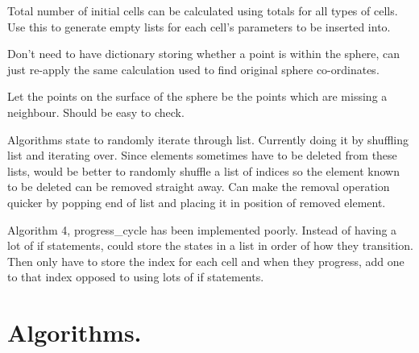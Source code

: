 \documentclass[english]{article}
\begin{document}
Total number of initial cells can be calculated using totals for all types of cells. Use this to generate empty lists for each cell's parameters to be inserted into. 

Don't need to have dictionary storing whether a point is within the sphere, can just re-apply the same calculation used to find original sphere co-ordinates. 

Let the points on the surface of the sphere be the points which are missing a neighbour. Should be easy to check.

Algorithms state to randomly iterate through list. Currently doing it by shuffling list and iterating over. Since elements sometimes have to be deleted from these lists, would be better to randomly shuffle a list of indices so the element known to be deleted can be removed straight away. Can make the removal operation quicker by popping end of list and placing it in position of removed element. 

Algorithm 4, progress\_cycle has been implemented poorly. Instead of having a lot of if statements, could store the states in a list in order of how they transition. Then only have to store the index for each cell and when they progress, add one to that index opposed to using lots of if statements. 






\section{Algorithms.}
\end{document}
